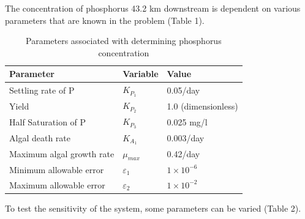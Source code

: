 \documentclass[titlepage,11pt]{article}
\begin{document}
The concentration of phosphorus 43.2 km downstream is dependent on
various parameters that are known in the problem (Table 1).
\begin{table}[h]\label{tbl:param}
\begin{center}
\caption{Parameters associated with determining phosphorus
concentration}
\begin{tabular}{|l|l|l|}
\hline
{\bf Parameter} & {\bf Variable} & {\bf Value} \\
\hline
Settling rate of P  &  $K_{P_1}$&     0.05/day \\
\hline
Yield &      $K_{P_2}$ &  1.0 (dimensionless) \\
\hline
Half Saturation of P  & $K_{P_3}$  & 0.025 mg/l\\
\hline
Algal death rate & $K_{A_1}$ &  0.003/day \\
\hline
Maximum algal growth rate & $\mu_{max}$ & 0.42/day\\
\hline
Minimum allowable error & $\varepsilon_1$ & $1\times10^{-6}$\\
\hline
Maximum allowable error & $\varepsilon_2$ &
$1\times10^{-2}$\\
\hline
\end{tabular}
\end{center}
\end{table}

To test the sensitivity of the system, some parameters can be varied
(Table 2).
\end{document}
